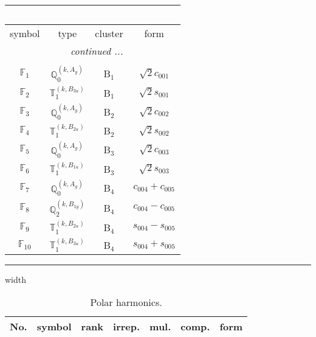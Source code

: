 \documentclass[fleqn,10pt,landscape]{article}
\begin{document}
\begin{itemize}
\begin{center}
\begin{longtable}{c|c|c|c}
\multicolumn{3}{l}{\tablename\ \thetable{}} \\
 \hline \hline
symbol & type & cluster & form \\ \hline \endhead

 \hline \hline
\multicolumn{3}{r}{\footnotesize\it continued ...} \\ \endfoot

 \hline \hline
\multicolumn{3}{r}{} \\ \endlastfoot

$ \mathbb{F}_{1} $ & $\mathbb{Q}_{0}^{(k,A_{g})}$ & B$_{1}$ & $\sqrt{2} c_{001}$ \\
$ \mathbb{F}_{2} $ & $\mathbb{T}_{1}^{(k,B_{3u})}$ & B$_{1}$ & $\sqrt{2} s_{001}$ \\ \hline
$ \mathbb{F}_{3} $ & $\mathbb{Q}_{0}^{(k,A_{g})}$ & B$_{2}$ & $\sqrt{2} c_{002}$ \\
$ \mathbb{F}_{4} $ & $\mathbb{T}_{1}^{(k,B_{2u})}$ & B$_{2}$ & $\sqrt{2} s_{002}$ \\ \hline
$ \mathbb{F}_{5} $ & $\mathbb{Q}_{0}^{(k,A_{g})}$ & B$_{3}$ & $\sqrt{2} c_{003}$ \\
$ \mathbb{F}_{6} $ & $\mathbb{T}_{1}^{(k,B_{1u})}$ & B$_{3}$ & $\sqrt{2} s_{003}$ \\ \hline
$ \mathbb{F}_{7} $ & $\mathbb{Q}_{0}^{(k,A_{g})}$ & B$_{4}$ & $c_{004} + c_{005}$ \\
$ \mathbb{F}_{8} $ & $\mathbb{Q}_{2}^{(k,B_{1g})}$ & B$_{4}$ & $c_{004} - c_{005}$ \\
$ \mathbb{F}_{9} $ & $\mathbb{T}_{1}^{(k,B_{2u})}$ & B$_{4}$ & $s_{004} - s_{005}$ \\
$ \mathbb{F}_{10} $ & $\mathbb{T}_{1}^{(k,B_{3u})}$ & B$_{4}$ & $s_{004} + s_{005}$ \\
\end{longtable}
\end{center}

 \hfil \hrule height 1mm width \textwidth \hfil

\begin{center}
\renewcommand{\arraystretch}{1.3}
\begin{longtable}{ccccccc}
\caption{Polar harmonics.}
 \\
 \hline \hline
No. & symbol & rank & irrep. & mul. & comp. & form \\ \hline \endfirsthead


\end{longtable}
\end{center}
\end{itemize}
\end{document}
